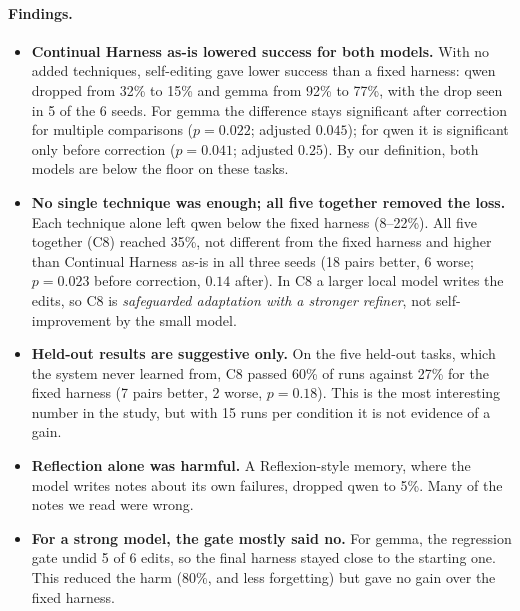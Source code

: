 \paragraph{Findings.}
\begin{itemize}
  \item \textbf{Continual Harness as-is lowered success for both models.} With no added techniques,
        self-editing gave lower success than a fixed harness: qwen dropped from 32\% to 15\% and
        gemma from 92\% to 77\%, with the drop seen in 5 of the 6 seeds. For gemma the difference
        stays significant after correction for multiple comparisons ($p = 0.022$; adjusted
        $0.045$); for qwen it is significant only before correction ($p = 0.041$; adjusted $0.25$).
        By our definition, both models are below the floor on these tasks.
  \item \textbf{No single technique was enough; all five together removed the loss.} Each
        technique alone left qwen below the fixed harness (8--22\%). All five together (C8) reached
        35\%, not different from the fixed harness and higher than Continual Harness as-is in all
        three seeds (18 pairs better, 6 worse; $p = 0.023$ before correction, $0.14$ after). In C8 a
        larger local model writes the edits, so C8 is \emph{safeguarded adaptation with a stronger
        refiner}, not self-improvement by the small model.
  \item \textbf{Held-out results are suggestive only.} On the five held-out tasks, which the system
        never learned from, C8 passed 60\% of runs against 27\% for the fixed harness (7 pairs
        better, 2 worse, $p = 0.18$). This is the most interesting number in the study, but with
        15 runs per condition it is not evidence of a gain.
  \item \textbf{Reflection alone was harmful.} A Reflexion-style memory, where the model writes
        notes about its own failures, dropped qwen to 5\%. Many of the notes we read were wrong.
  \item \textbf{For a strong model, the gate mostly said no.} For gemma, the regression gate undid
        5 of 6 edits, so the final harness stayed close to the starting one. This reduced the harm
        (80\%, and less forgetting) but gave no gain over the fixed harness.
\end{itemize}

